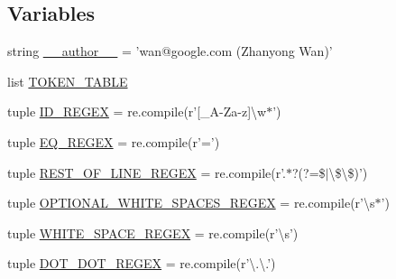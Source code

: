 \subsection*{Variables}
\begin{DoxyCompactItemize}
\item 
string \hyperlink{namespacepump_ab99a065546038823261c774117df0798}{\-\_\-\-\_\-author\-\_\-\-\_\-} = 'wan@google.\-com (Zhanyong Wan)'
\item 
list \hyperlink{namespacepump_a132b35d1104c7f479aa21c345f413477}{T\-O\-K\-E\-N\-\_\-\-T\-A\-B\-L\-E}
\item 
tuple \hyperlink{namespacepump_a11804cc01a8aef9c8700d3e44e0b518f}{I\-D\-\_\-\-R\-E\-G\-E\-X} = re.\-compile(r'\mbox{[}\-\_\-\-A-\/Za-\/z\mbox{]}\textbackslash{}w$\ast$')
\item 
tuple \hyperlink{namespacepump_a7f1b6c8a70ec140d90340ae8276143a6}{E\-Q\-\_\-\-R\-E\-G\-E\-X} = re.\-compile(r'=')
\item 
tuple \hyperlink{namespacepump_a9d83d0ef3310ed836f08fadd37b4409d}{R\-E\-S\-T\-\_\-\-O\-F\-\_\-\-L\-I\-N\-E\-\_\-\-R\-E\-G\-E\-X} = re.\-compile(r'.$\ast$?(?=\$$\vert$\textbackslash{}\$\textbackslash{}\$)')
\item 
tuple \hyperlink{namespacepump_ad9744f334322fa37e310075e5e1ec40c}{O\-P\-T\-I\-O\-N\-A\-L\-\_\-\-W\-H\-I\-T\-E\-\_\-\-S\-P\-A\-C\-E\-S\-\_\-\-R\-E\-G\-E\-X} = re.\-compile(r'\textbackslash{}s$\ast$')
\item 
tuple \hyperlink{namespacepump_a2ee63d094f26f3731f6c830b89b7e533}{W\-H\-I\-T\-E\-\_\-\-S\-P\-A\-C\-E\-\_\-\-R\-E\-G\-E\-X} = re.\-compile(r'\textbackslash{}s')
\item 
tuple \hyperlink{namespacepump_a7ceff323392938f56a70e8612f51294c}{D\-O\-T\-\_\-\-D\-O\-T\-\_\-\-R\-E\-G\-E\-X} = re.\-compile(r'\textbackslash{}.\textbackslash{}.')
\end{DoxyCompactItemize}


